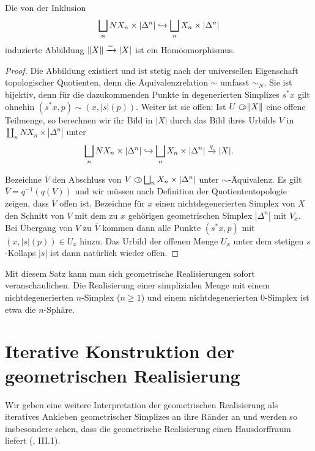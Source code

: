 \begin{satz}
  Die von der Inklusion
  \[ \bigsqcup_n NX_n \times |\Delta^n| \hookrightarrow \bigsqcup_n X_n \times |\Delta^n| \]
  induzierte Abbildung $\|X\| \xrightarrow[]{\sim} |X|$ ist ein Homöomorphismus.
\end{satz}
\begin{proof}
  Die Abbildung existiert und ist stetig nach der universellen
  Eigenschaft topologischer Quotienten, denn die Äquivalenzrelation
  $\sim$ umfasst $\sim_N$. Sie ist bijektiv, denn für die
  dazukommenden Punkte in degenerierten Simplizes $s^* x$ gilt ohnehin
  $(s^* x, p) \sim (x, |s|(p))$. Weiter ist sie offen: Ist $U \subset\kern-0.58em\circ
  \|X\|$ eine offene Teilmenge, so berechnen wir ihr Bild in $|X|$
  durch das Bild ihres Urbilds $V$ in $\coprod_n NX_n \times
  |\Delta^n|$ unter
  \[ \bigsqcup_n NX_n \times |\Delta^n|
  \hookrightarrow \bigsqcup_n X_n \times |\Delta^n| \xrightarrow{q} |X|. \]

  Bezeichne $\overline{V}$ den Abschluss von $V \subset\kern-0.58em\circ \bigsqcup_n X_n
  \times |\Delta^n|$ unter $\sim$-Äquivalenz. Es gilt $\overline{V} =
  q^{-1}(q(V))$ und wir müssen nach Definition der Quotiententopologie
  zeigen, dass $\overline{V}$ offen ist. Bezeichne für $x$ einen
  nichtdegenerierten Simplex von $X$ den Schnitt von $V$ mit dem zu
  $x$ gehörigen geometrischen Simplex $|\Delta^n|$ mit $V_x$. Bei
  Übergang von $V$ zu $\overline{V}$ kommen dann alle Punkte $(s^* x,
  p)$ mit $(x, |s|(p)) \in U_x$ hinzu. Das Urbild der offenen Menge $U_x$
  unter dem stetigen $s$-Kollaps $|s|$ ist dann natürlich wieder
  offen.
\end{proof}
\begin{bsp} \label{ex:real-sphere}
  Mit diesem Satz kann man sich geometrische Realisierungen sofort
  veranschaulichen. Die Realisierung einer simplizialen Menge mit
  einem nichtdegenerierten $n$-Simplex ($n \geq 1$) und einem
  nichtdegenerierten $0$-Simplex ist etwa die $n$-Sphäre.
\end{bsp}

\section{Iterative Konstruktion der geometrischen Realisierung}

Wir geben eine weitere Interpretation der geometrischen Realisierung
als iteratives Ankleben geometrischer Simplizes an ihre Ränder an und
werden so insbesondere sehen, dass die geometrische Realisierung einen
Hausdorffraum liefert (\cite{Moer}, III.1).

